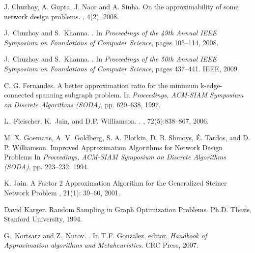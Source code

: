 \documentclass[11pt]{article}
\newcounter{thm0Rcopies}
\newcounter{thm_saved}
\begin{document}
\begin{thebibliography}{10}
J. Chuzhoy, A. Gupta, J. Naor and A. Sinha.
\newblock On the approximability of some network design problems.
, 4(2), 2008.

J.~Chuzhoy and S.~Khanna.
.
\newblock In {\em Proceedings of the 49th Annual IEEE Symposium on Foundations
  of Computer Science}, pages 105--114, 2008.

J.~Chuzhoy and S.~Khanna.
.
\newblock In {\em Proceedings of the 50th Annual IEEE Symposium on Foundations
  of Computer Science}, pages 437--441. IEEE, 2009.






C. G. Fernandes.
\newblock A better approximation ratio for the minimum k-edge-connected spanning subgraph problem.
\newblock In {\em Proceedings, ACM-SIAM Symposium on Discrete
  Algorithms (SODA)}, pp. 629--638, 1997.

L.~Fleischer, K.~Jain, and D.P. Williamson.
.
, 72(5):838--867, 2006.

M. X. Goemans, A. V. Goldberg, S. A. Plotkin, D. B. Shmoys, \'{E}. Tardos, and D. P. Williamson.
\newblock Improved Approximation Algorithms for Network Design Problems
\newblock In {\em Proceedings, ACM-SIAM Symposium on Discrete Algorithms (SODA)},
  pp. 223--232, 1994.









K. Jain.
\newblock A Factor 2 Approximation Algorithm for the Generalized Steiner Network Problem
, 21(1): 39--60, 2001.

David Karger.
\newblock Random Sampling in Graph Optimization Problems.
\newblock Ph.D. Thesis, Stanford University, 1994.

G.~Kortsarz and Z.~Nutov.
.
\newblock In T.F. Gonzalez, editor, {\em Handbook of Approximation algorithms
  and Metaheuristics}. CRC Press, 2007.








\end{thebibliography}
\end{document}
